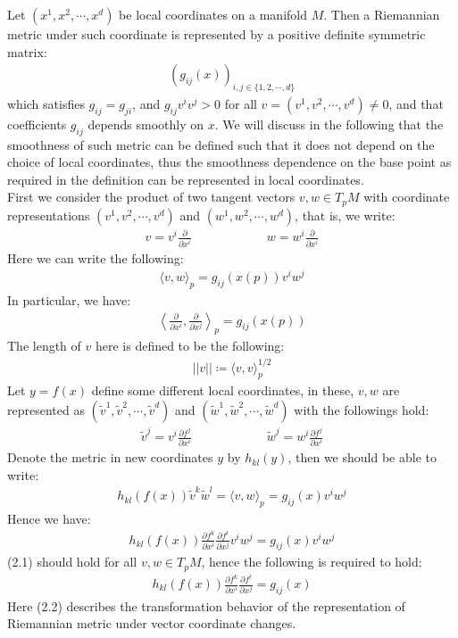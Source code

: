 \documentclass[11pt]{book}
\theoremstyle{break}
\theoremstyle{break}
\newcommand{\pd}{\partial}
\newcommand{\that}[1]{\widetilde{#1}}
\begin{document}
Let $(x^1,x^2,\cdots, x^d)$ be local coordinates on a manifold $M$. Then a Riemannian metric under such coordinate is represented by a positive definite symmetric matrix:
\begin{align*}
(g_{ij}(x) ) _{i,j \in\{ 1,2,\cdots, d\}}
\end{align*}
which satisfies $g_{ij} = g_{ji}$, and $g_{ij}v^i v^j >0$ for all $v = (v^1, v^2,\cdots, v^d) \neq 0$, and that coefficients $g_{ij}$ depends smoothly on $x$. We will discuss in the following that the smoothness of such metric can be defined such that it does not depend on the choice of local coordinates, thus the smoothness dependence on the base point as required in the definition can be represented in local coordinates. \\


First we consider the product of two tangent vectors $v,w \in T_pM$ with coordinate representations $(v^1,v^2,\cdots,v^d)$ and $(w^1,w^2,\cdots, w^d)$, that is, we write:
\begin{align*}
v = v^i \frac{\pd}{\pd x^i} \qquad\qquad\qquad w = w^i \frac{\pd}{\pd x^i}
\end{align*}
Here we can write the following:
\begin{align*}
\langle v, w\rangle_p = g_{ij}(x(p))v^iw^j
\end{align*}
In particular, we have:
\begin{align*}
\left\langle \frac{\pd}{\pd x^i}, \frac{\pd}{\pd x^j}\right\rangle_p = g_{ij}(x(p))
\end{align*}
The length of $v$ here is defined to be the following:
\begin{align*}
||v|| \coloneqq \langle v, v\rangle_p^{1/2}
\end{align*}
Let $y = f(x)$ define some different local coordinates, in these, $v,w$ are represented as $(\that{v}^1, \that{v}^2,\cdots, \that{v}^d)$ and $(\that{w}^1, \that{w}^2,\cdots, \that{w}^d)$ with the followings hold:
\begin{align*}
\that{v}^j = v^i \frac{\pd f^j}{\pd x^i} \qquad\qquad\qquad \that{w}^j = w^i \frac{\pd f^j}{\pd x^i}
\end{align*}
Denote the metric in new coordinates $y$ by $h_{kl}(y)$, then we should be able to write:
\begin{align*}
h_{kl}(f(x))\that{v}^k\that{w}^l = \langle v, w\rangle_p = g_{ij}(x)v^iw^j
\end{align*}
Hence we have:
\begin{align}
h_{kl}(f(x)) \frac{\pd f^k}{\pd x^i}\frac{\pd f^l}{\pd x^j}v^iw^j = g_{ij}(x)v^iw^j
\end{align} 
(2.1) should hold for all $v,w \in T_pM$, hence the following is required to hold:
\begin{align}
h_{kl}(f(x))\frac{\pd f^k}{\pd x^i}\frac{\pd f^l}{\pd x^j} = g_{ij}(x)
\end{align}
Here (2.2) describes the transformation behavior of the representation of Riemannian metric under vector coordinate changes. \\
\end{document}

